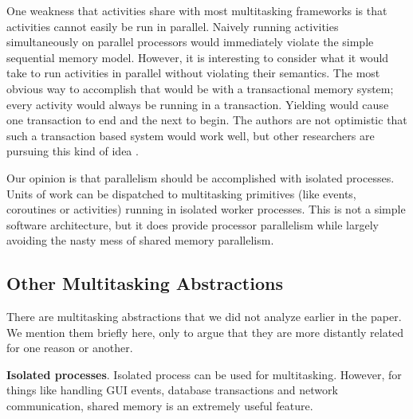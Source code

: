 \documentclass[9pt,preprint]{sigplanconf-2}
\begin{document}
One weakness that activities share with most multitasking frameworks is that activities cannot easily be run in parallel.
Naively running activities simultaneously on parallel processors would immediately violate the simple sequential memory model.
However, it is interesting to consider what it would take to run activities in parallel without violating their semantics.
The most obvious way to accomplish that would be with a transactional memory system; every activity would always be running in a transaction.
Yielding would cause one transaction to end and the next to begin.
The authors are not optimistic that such a transaction based system would work well, but other researchers are pursuing this kind of idea \cite{ONeill2015, Boussinot2006, Dabrowski2006}.

Our opinion is that parallelism should be accomplished with isolated processes.
Units of work can be dispatched to multitasking primitives (like events, coroutines or activities) running in isolated worker processes.
This is not a simple software architecture, but it does provide processor parallelism while largely avoiding the nasty mess of shared memory parallelism.




\subsection{Other Multitasking Abstractions}

There are multitasking abstractions that we did not analyze earlier in the paper.
We mention them briefly here, only to argue that they are more distantly related for one reason or another.

\textbf{Isolated processes}.
Isolated process can be used for multitasking.
However, for things like handling GUI events, database transactions and network communication, shared memory is an extremely useful feature.
\end{document}
